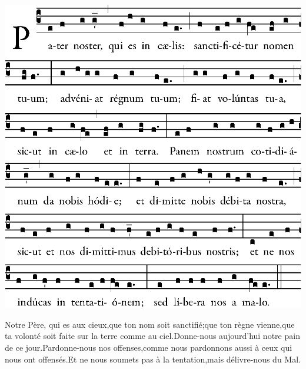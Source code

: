 \begin{center}
\includegraphics[width=.9\textwidth]{src/ordinario/pater.eps}
\end{center}

\be Notre Père, qui es aux cieux,\redast que ton nom soit sanctifié;\redast que ton règne vienne,\redast que ta volonté soit faite sur la terre comme au ciel.\redast Donne-nous aujourd'hui notre pain de ce jour.\redast Pardonne-nous nos offenses,\redast comme nous pardonnons aussi à ceux qui nous ont offensés.\redast Et ne nous soumets pas à la tentation,\redast mais délivre-nous du Mal.